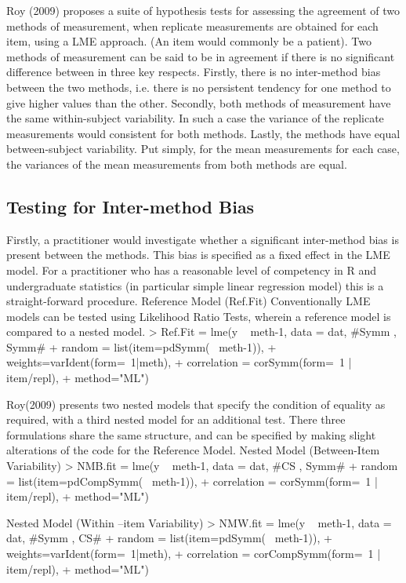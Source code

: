 Roy (2009) proposes a suite of hypothesis tests for assessing the agreement of two methods of measurement, when replicate measurements are obtained for each item, using a LME approach. (An item would commonly be a patient).  
Two methods of measurement can be said to be in agreement if there is no significant difference between in three key respects. Firstly, there is no inter-method bias between the two methods, i.e. there is no persistent tendency for one method to give higher values than the other.
Secondly, both methods of measurement have the same  within-subject variability. In such a case the variance of the replicate measurements would consistent for both methods.
Lastly, the methods have equal between-subject variability.  Put simply, for the mean measurements for each case, the variances of the mean measurements from both methods are equal.
\subsection*{Testing for Inter-method Bias}
Firstly, a practitioner would investigate whether a significant inter-method bias is present between the methods. This bias is specified as a fixed effect in the LME model.  For a practitioner who has a reasonable level of competency in R and undergraduate statistics (in particular simple linear regression model) this is a straight-forward procedure.
Reference Model (Ref.Fit)
Conventionally LME models can be tested using Likelihood Ratio Tests, wherein a reference model is compared to a nested model.
> Ref.Fit = lme(y ~ meth-1, data = dat,   #Symm , Symm#
+     random = list(item=pdSymm(~ meth-1)), 
+     weights=varIdent(form=~1|meth),
+     correlation = corSymm(form=~1 | item/repl), 
+     method="ML")

Roy(2009) presents two nested models that specify the condition of equality as required, with a third nested model for an additional test. There three formulations share the same structure, and can be specified by making slight alterations of the code for the Reference Model.
Nested Model (Between-Item Variability)
> NMB.fit  = lme(y ~ meth-1, data = dat,   #CS , Symm#
+     random = list(item=pdCompSymm(~ meth-1)),
+     correlation = corSymm(form=~1 | item/repl), 
+     method="ML")





Nested Model (Within –item Variability)
> NMW.fit = lme(y ~ meth-1, data = dat,   #Symm , CS# 
+     random = list(item=pdSymm(~ meth-1)),
+     weights=varIdent(form=~1|meth), 
+     correlation = corCompSymm(form=~1 | item/repl), 
+     method="ML")


